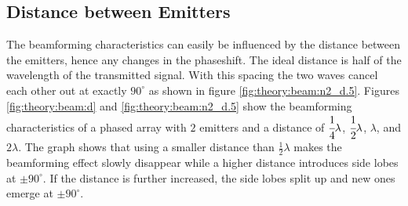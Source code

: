 \subsection{Distance between Emitters}

The beamforming characteristics can easily be influenced by the distance between the emitters, hence any changes in the phaseshift.
The ideal distance is half of the wavelength of the transmitted signal. With this spacing the two waves cancel each other out at exactly $90^\circ$ as shown in figure \ref{fig:theory:beam:n2_d.5}.\p
%
Figures \ref{fig:theory:beam:d} and \ref{fig:theory:beam:n2_d.5} show the beamforming characteristics of a phased array with $2$ emitters and a distance of $\cfrac{1}{4}\lambda$, $\cfrac{1}{2}\lambda$, $\lambda$, and $2\lambda$. The graph shows that using a smaller distance than $\frac{1}{2} \lambda$ makes the beamforming effect slowly disappear while a higher distance introduces side lobes at $\pm 90^\circ$. If the distance is further increased, the side lobes split up and new ones emerge at $\pm 90^\circ$.
%

